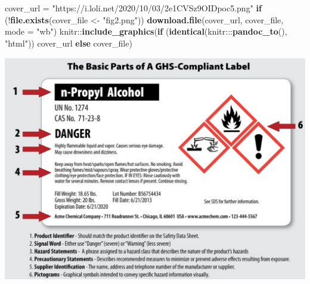 \documentclass[]{tufte-book}
\newenvironment{Shaded}{}{}
\newcommand{\ControlFlowTok}[1]{\textcolor[rgb]{0.00,0.44,0.13}{\textbf{#1}}}
\newcommand{\DataTypeTok}[1]{\textcolor[rgb]{0.56,0.13,0.00}{#1}}
\newcommand{\KeywordTok}[1]{\textcolor[rgb]{0.00,0.44,0.13}{\textbf{#1}}}
\newcommand{\NormalTok}[1]{#1}
\newcommand{\OperatorTok}[1]{\textcolor[rgb]{0.40,0.40,0.40}{#1}}
\newcommand{\StringTok}[1]{\textcolor[rgb]{0.25,0.44,0.63}{#1}}
\begin{document}
\begin{Shaded}
\begin{Highlighting}[]
\NormalTok{cover_url =}\StringTok{ "https://i.loli.net/2020/10/03/2e1CVSz9OIDpoc5.png"}
\ControlFlowTok{if}\NormalTok{ (}\OperatorTok{!}\KeywordTok{file.exists}\NormalTok{(cover_file <-}\StringTok{ "fig2.png"}\NormalTok{)) }\KeywordTok{download.file}\NormalTok{(cover_url, cover_file, }
    \DataTypeTok{mode =} \StringTok{"wb"}\NormalTok{)}
\NormalTok{knitr}\OperatorTok{::}\KeywordTok{include_graphics}\NormalTok{(}\ControlFlowTok{if}\NormalTok{ (}\KeywordTok{identical}\NormalTok{(knitr}\OperatorTok{:::}\KeywordTok{pandoc_to}\NormalTok{(), }\StringTok{"html"}\NormalTok{)) cover_url }\ControlFlowTok{else}\NormalTok{ cover_file)}
\end{Highlighting}
\end{Shaded}

\includegraphics[width=20.53in]{fig2}
\end{document}

